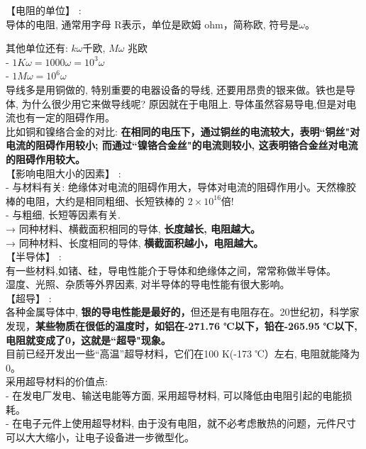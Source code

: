 \documentclass[UTF8]{ctexart}
\begin{document}
【电阻的单位】 : \\
导体的电阻, 通常用字母 R表示，单位是欧姆 ohm，简称欧, 符号是$\omega$。

其他单位还有: $k \omega$千欧, $M \omega$ 兆欧 \\
- $1 K\omega = 1000\omega = 10^3 \omega$ \\
- $1 M\omega = 10^6 \omega$ \\

导线多是用铜做的, 特别重要的电器设备的导线, 还要用昂贵的银来做。铁也是导体, 为什么很少用它来做导线呢? 原因就在于电阻上. 导体虽然容易导电,但是对电流也有一定的阻碍作用。\\
比如铜和镍络合金的对比: \textbf{在相同的电压下，通过铜丝的电流较大，表明``铜丝"对电流的阻碍作用较小; 而通过``镍铬合金丝"的电流则较小, 这表明铬合金丝对电流的阻碍作用较大。} \\


【影响电阻大小的因素】 : \\
- 与材料有关: 绝缘体对电流的阻碍作用大，导体对电流的阻碍作用小。天然橡胶棒的电阻，大约是相同粗细、长短铁棒的 $2×10^{16}$倍! \\
- 与粗细, 长短等因素有关. \\
→ 同种材料、横截面积相同的导体, \textbf{长度越长, 电阻越大。} \\
→ 同种材料、长度相同的导体, \textbf{横截面积越小，电阻越大。} \\


【半导体】 : \\
有一些材料,如锗、硅，导电性能介于导体和绝缘体之间，常常称做半导体。 \\
湿度、光照、杂质等外界因素, 对半导体的导电性能有很大影响。\\


【超导】 : \\
各种金属导体中, \textbf{银的导电性能是最好的，}但还是有电阻存在。20世纪初，科学家发现，\textbf{某些物质在很低的温度时，如铝在-271.76 ℃以下，铅在-265.95 ℃以下,电阻就变成了0，这就是``超导"现象。} \\
目前已经开发出一些“高温”超导材料，它们在100 K(-173 ℃）左右, 电阻就能降为0。\\

采用超导材料的价值点: \\
- 在发电厂发电、输送电能等方面, 采用超导材料, 可以降低由电阻引起的电能损耗。  \\
- 在电子元件上使用超导材料, 由于没有电阻，就不必考虑散热的问题，元件尺寸可以大大缩小，让电子设备进一步微型化。 \\
\end{document}
